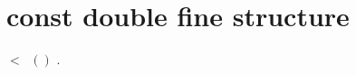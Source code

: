 \hypertarget{group__constant}{}\section{const double fine structure}
\label{group__constant}
$<$ $ \ ()$ . 